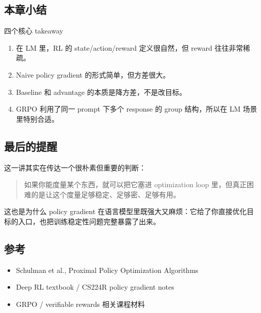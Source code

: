 \documentclass[a4paper]{article}
\begin{document}
\subsection{本章小结}

\begin{importantbox}{四个核心 takeaway}
\begin{enumerate}
    \item 在 LM 里，RL 的 state/action/reward 定义很自然，但 reward 往往非常稀疏。
    \item Naive policy gradient 的形式简单，但方差很大。
    \item Baseline 和 advantage 的本质是降方差，不是改目标。
    \item GRPO 利用了同一 prompt 下多个 response 的 group 结构，所以在 LM 场景里特别合适。
\end{enumerate}
\end{importantbox}


\subsection{最后的提醒}

这一讲其实在传达一个很朴素但重要的判断：
\begin{quote}
如果你能度量某个东西，就可以把它塞进 optimization loop 里，但真正困难的是让这个度量足够稳定、足够密、足够有用。
\end{quote}

这也是为什么 policy gradient 在语言模型里既强大又麻烦：它给了你直接优化目标的入口，也把训练稳定性问题完整暴露了出来。

\subsection{参考}

\begin{itemize}
    \item Schulman et al., Proximal Policy Optimization Algorithms
    \item Deep RL textbook / CS224R policy gradient notes
    \item GRPO / verifiable rewards 相关课程材料
\end{itemize}
\end{document}

